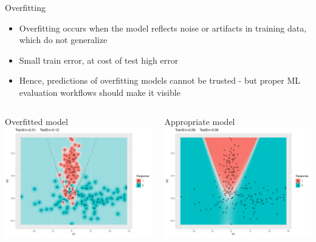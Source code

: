 \begin{vbframe}{Overfitting}

\begin{itemize}
  \item Overfitting occurs when the model reflects noise or artifacts in training data,
      which do not generalize
  \item Small train error, at cost of test high error
  \item Hence, predictions of overfitting models cannot be trusted -
      but proper ML evaluation workflows should make it visible
\end{itemize}
\lz
\begin{columns}
\begin{column}{0.5\textwidth}
  \raggedright
  Overfitted model\\
  \includegraphics[width=\textwidth]{figure/eval_ofit_1o}
\end{column}
\begin{column}{0.5\textwidth}
  \raggedright
    Appropriate model\\
  \includegraphics[width=\textwidth]{figure/eval_ofit_1a}
\end{column}
\end{columns}
\end{vbframe}


